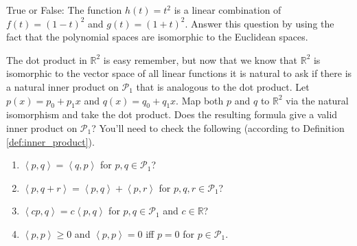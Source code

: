 %             

\begin{problem}
    True or False: The function $h(t) = t^2$ is a linear combination of $f(t) = (1-t)^2$
    and $g(t) = (1+t)^2$. Answer this question by using the fact
    that the polynomial spaces are isomorphic to the Euclidean spaces.
\end{problem}


\begin{problem}
    The dot product in $\mathbb{R}^2$ is easy remember, but now that we know that
    $\mathbb{R}^2$ is isomorphic to the vector space of all linear functions it is natural
    to ask if there is a natural inner product on $\mathcal{P}_1$ that is analogous to the
    dot product.  Let $p(x) = p_0 + p_1x$ and $q(x) = q_0 + q_1 x$.  Map both $p$ and $q$
    to $\mathbb{R}^2$ via the natural isomorphism and take the dot product.  Does the
    resulting formula give a valid inner product on $\mathcal{P}_1$?  You'll need to check
    the following (according to Definition \ref{def:inner_product}).
    \begin{enumerate}
        \item $\left< p,q\right> = \left<q,p\right>$ for $p,q\in\mathcal{P}_1$?
        \item $\left< p,q+r\right> = \left<p,q\right> + \left<p,r\right>$ for
            $p,q,r\in\mathcal{P}_1$?
        \item $\left<cp,q\right> = c\left<p,q\right>$ for $p,q\in\mathcal{P}_1$ and $c \in \mathbb{R}$?
        \item $\left<p,p\right> \ge 0$ and $\left<p,p\right>=0$ iff $p=0$ for $p \in
            \mathcal{P}_1$.
    \end{enumerate}
\end{problem}



